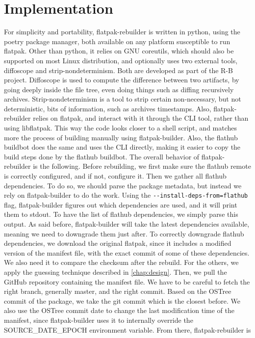 \documentclass[a4paper,11pt,oneside]{report}
\theoremstyle{definition}
\newcommand{\sysname}{flatpak-rebuilder\xspace}
\newcommand{\fp}{flatpak\xspace}
\newcommand{\fh}{flathub\xspace}
\newcommand{\fb}{flatpak-builder\xspace}
\newcommand{\sde}{SOURCE\_DATE\_EPOCH\xspace}
\newcommand{\fhbb}{flathub buildbot\xspace}
\newcommand{\ot}{OSTree\xspace}
\begin{document}
\chapter{Implementation}
\label{chap:impl}

For simplicity and portability, \sysname is written in python, using the poetry
package manager, both available on any platform susceptible to run \fp. Other
than python, it relies on GNU coreutils, which should also be supported on most
Linux distribution, and optionally uses two external tools, diffoscope and
strip-nondeterminism. Both are developed as part of the R-B project. Diffoscope
is used to compute the difference between two artifacts, by going deeply inside
the file tree, even doing things such as diffing recursively archives.
Strip-nondeterminism is a tool to strip certain non-necessary, but not
deterministic, bits of information, such as archives timestamps. Also, \sysname
relies on \fp, and interact with it through the CLI tool, rather than using
libflatpak. This way the code looks closer to a shell script, and matches more
the process of building manually using \fb. Also, the \fhbb does the same and
uses the CLI directly, making it easier to copy the build steps done by the
\fhbb. The overall behavior of \sysname is the following. Before rebuilding, we
first make sure the \fh remote is correctly configured, and if not, configure
it. Then we gather all \fh dependencies. To do so, we should parse the package
metadata, but instead we rely on \fb to do the work. Using the
\verb|--install-deps-from=flathub| flag, \fb figures out which dependencies are
used, and it will print them to stdout. To have the list of \fh dependencies,
we simply parse this output. As said before, \fb will take the latest
dependencies available, meaning we need to downgrade them just after. To
correctly downgrade \fh dependencies, we download the original \fp, since it
includes a modified version of the manifest file, with the exact commit of some
of these dependencies. We also need it to compare the checksum after the
rebuild. For the others, we apply the guessing technique described in
\autoref{chap:design}. Then, we pull the GitHub repository containing the
manifest file. We have to be careful to fetch the right branch, generally
master, and the right commit. Based on the \ot commit of the package, we
take the git commit which is the closest before. We also use the \ot commit
date to change the last modification time of the manifest, since \fb uses it to
internally override the \sde environment variable. From there, \sysname is
\end{document}
